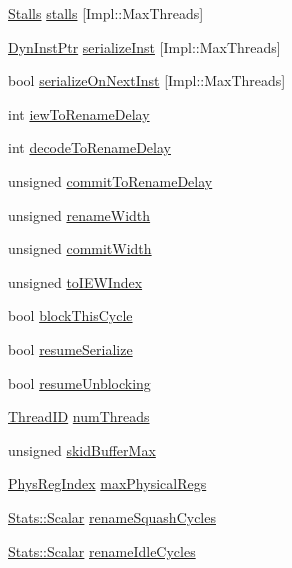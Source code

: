 \begin{DoxyCompactItemize}
\item 
\hyperlink{structDefaultRename_1_1Stalls}{Stalls} \hyperlink{classDefaultRename_ade48cf321f5741ea8e54e071680cacdc}{stalls} \mbox{[}Impl::MaxThreads\mbox{]}
\item 
\hyperlink{classDefaultRename_a028ce10889c5f6450239d9e9a7347976}{DynInstPtr} \hyperlink{classDefaultRename_a12ab5fca837718e12cc837d0f3c1da82}{serializeInst} \mbox{[}Impl::MaxThreads\mbox{]}
\item 
bool \hyperlink{classDefaultRename_a4d99bc7f86d1a17d44e59c316c273262}{serializeOnNextInst} \mbox{[}Impl::MaxThreads\mbox{]}
\item 
int \hyperlink{classDefaultRename_a3069f8fd673d0e9ea2b1a8ce0ad3fe06}{iewToRenameDelay}
\item 
int \hyperlink{classDefaultRename_a4ff2f51d1e391f739d6d1c73a6bcd0c1}{decodeToRenameDelay}
\item 
unsigned \hyperlink{classDefaultRename_a03ebbedbf40ac0005574e50b3577a651}{commitToRenameDelay}
\item 
unsigned \hyperlink{classDefaultRename_a4b41704382bddb6ee06b5ce97b47dd7b}{renameWidth}
\item 
unsigned \hyperlink{classDefaultRename_aeab15260a0ccc0ea470bb74344b63d17}{commitWidth}
\item 
unsigned \hyperlink{classDefaultRename_abb033b9572d00b4ffa5aca6c7fb51427}{toIEWIndex}
\item 
bool \hyperlink{classDefaultRename_a5a5235d747599dbd49a887663f3739e8}{blockThisCycle}
\item 
bool \hyperlink{classDefaultRename_afa9ffeefc4b3ff8ae1ea9919bedbd1e4}{resumeSerialize}
\item 
bool \hyperlink{classDefaultRename_aacc2e9a4766def499954195037465d42}{resumeUnblocking}
\item 
\hyperlink{base_2types_8hh_ab39b1a4f9dad884694c7a74ed69e6a6b}{ThreadID} \hyperlink{classDefaultRename_a88377f855dbf5adeeecb06b5bb821d35}{numThreads}
\item 
unsigned \hyperlink{classDefaultRename_a268414a6444b620140f263013a739a17}{skidBufferMax}
\item 
\hyperlink{o3_2comm_8hh_a5ec29599c4bc29a3054c451674969e7b}{PhysRegIndex} \hyperlink{classDefaultRename_acc18d044ab2bf32e6515938485638d28}{maxPhysicalRegs}
\item 
\hyperlink{classStats_1_1Scalar}{Stats::Scalar} \hyperlink{classDefaultRename_a8931e7bb259c1fe875fd5a88017b29e2}{renameSquashCycles}
\item 
\hyperlink{classStats_1_1Scalar}{Stats::Scalar} \hyperlink{classDefaultRename_a53baed8fe49369b373c3dd986c683596}{renameIdleCycles}

\end{DoxyCompactItemize}
